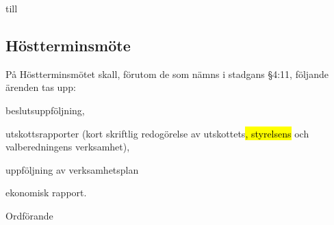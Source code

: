 \documentclass[../_main/handlingar.tex]{subfiles}
\begin{document}
\begin{attsatser}
till

\subsection{Höstterminsmöte}
På Höstterminsmötet skall, förutom de som nämns i stadgans §4:11,
följande ärenden tas upp:
\begin{alphlist}
    \item beslutsuppföljning,
    \item utskottsrapporter (kort skriftlig redogörelse av utskottets\hl{, styrelsens } och valberedningens verksamhet),
   	\item uppföljning av verksamhetsplan
    \item ekonomisk rapport.
\end{alphlist}
\changenote

\end{attsatser}







\begin{signatures}{1}
    \ist
    \signature{\ordf}{Ordförande}

\end{signatures}
\end{document}
